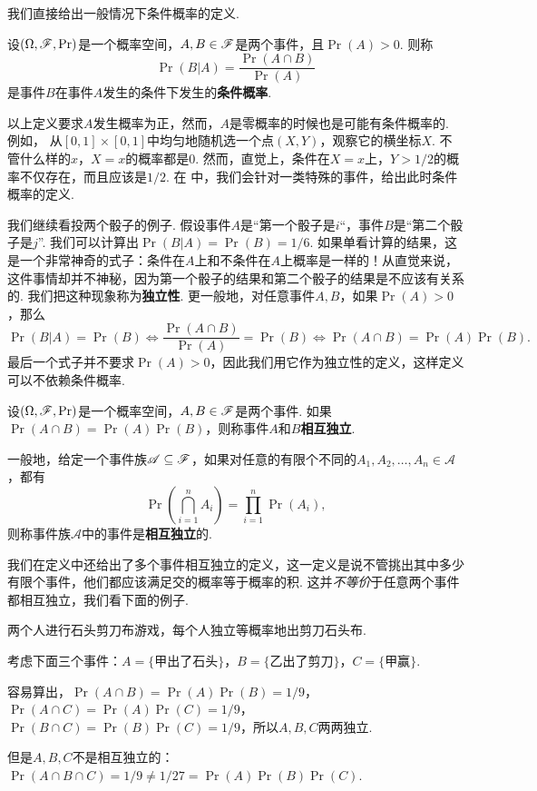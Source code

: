 我们直接给出一般情况下条件概率的定义. 

\begin{definition}[条件概率]
设$(\Omega,\mathscr{F},\Pr)$是一个概率空间，$A,B\in\mathscr{F}$是两个事件，且$\Pr(A)>0$. 则称
\[
    \Pr(B|A) = \frac{\Pr(A\cap B)}{\Pr(A)}
\]
是事件$B$在事件$A$发生的条件下发生的\textbf{条件概率}. 
\end{definition}

以上定义要求$A$发生概率为正，然而，$A$是零概率的时候也是可能有条件概率的. 例如，
从$[0,1]\times[0,1]$中均匀地随机选一个点$(X,Y)$，观察它的横坐标$X$. 不管什么样的$x$，$X=x$的概率都是$0$. 然而，直觉上，条件在$X=x$上，$Y>1/2$的概率不仅存在，而且应该是$1/2$. 在 中，我们会针对一类特殊的事件，给出此时条件概率的定义. 

我们继续看投两个骰子的例子. 假设事件$A$是“第一个骰子是$i$“，事件$B$是“第二个骰子是$j$”. 我们可以计算出$\Pr(B|A)=\Pr(B)=1/6$. 如果单看计算的结果，这是一个非常神奇的式子：条件在$A$上和不条件在$A$上概率是一样的！从直觉来说，这件事情却并不神秘，因为第一个骰子的结果和第二个骰子的结果是不应该有关系的. 我们把这种现象称为\textbf{独立性}. 更一般地，对任意事件$A,B$，如果$\Pr(A)>0$，那么
\[\Pr(B|A)=\Pr(B)\iff \frac{\Pr(A\cap B)}{\Pr(A)}=\Pr(B)\iff \Pr(A\cap B)=\Pr(A)\Pr(B).\]
最后一个式子并不要求$\Pr(A)>0$，因此我们用它作为独立性的定义，这样定义可以不依赖条件概率. 

\begin{definition}[独立性]
设$(\Omega,\mathscr{F},\Pr)$是一个概率空间，$A,B\in\mathscr{F}$是两个事件. 如果$\Pr(A\cap B)=\Pr(A)\Pr(B)$，则称事件$A$和$B$\textbf{相互独立}. 

一般地，给定一个事件族$\mathscr{A}\subseteq\mathscr{F}$，如果对任意的有限个不同的$A_1,A_2,\ldots,A_n\in\mathscr{A}$，都有
\[
    \Pr\left(\bigcap_{i=1}^n A_i\right) = \prod_{i=1}^n \Pr(A_i),
\]
则称事件族$\mathscr{A}$中的事件是\textbf{相互独立}的. 
\end{definition}

我们在定义中还给出了多个事件相互独立的定义，这一定义是说不管挑出其中多少有限个事件，他们都应该满足交的概率等于概率的积. 这并\emph{不等价}于任意两个事件都相互独立，我们看下面的例子. 

\begin{example}
两个人进行石头剪刀布游戏，每个人独立等概率地出剪刀石头布. 

考虑下面三个事件：$A=\{\text{甲出了石头}\}$，$B=\{\text{乙出了剪刀}\}$，$C=\{\text{甲赢}\}$.

容易算出，$\Pr(A\cap B)=\Pr(A)\Pr(B)=1/9$，$\Pr(A\cap C)=\Pr(A)\Pr(C)=1/9$，$\Pr(B\cap C)=\Pr(B)\Pr(C)=1/9$，所以$A,B,C$两两独立. 

但是$A,B,C$不是相互独立的：$\Pr(A\cap B\cap C)=1/9\neq 1/27=\Pr(A)\Pr(B)\Pr(C)$.
\end{example}


